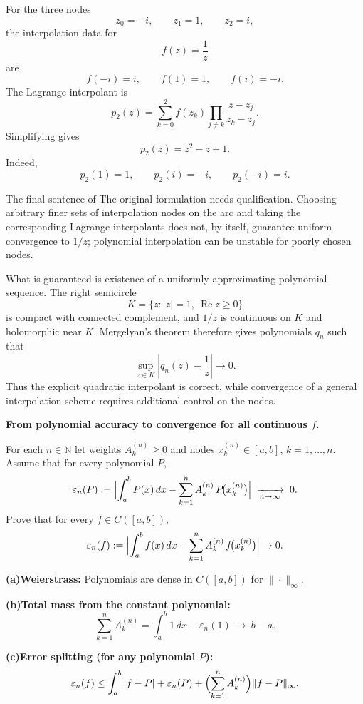 \begin{solution}
For the three nodes
\[
z_0=-i,\qquad z_1=1,\qquad z_2=i,
\]
the interpolation data for
\[
f(z)=\frac1z
\]
are
\[
f(-i)=i,\qquad f(1)=1,\qquad f(i)=-i.
\]
The Lagrange interpolant is
\[
p_2(z)
=
\sum_{k=0}^{2}
f(z_k)
\prod_{j\ne k}
\frac{z-z_j}{z_k-z_j}.
\]
Simplifying gives
\[
\boxed{
p_2(z)=z^2-z+1.
}
\]
Indeed,
\[
p_2(1)=1,\qquad
p_2(i)=-i,\qquad
p_2(-i)=i.
\]

The final sentence of The original formulation needs qualification. Choosing arbitrary finer sets
of interpolation nodes on the arc and taking the corresponding Lagrange interpolants does
not, by itself, guarantee uniform convergence to \(1/z\); polynomial interpolation can be
unstable for poorly chosen nodes.

What is guaranteed is existence of a uniformly approximating polynomial sequence. The
right semicircle
\[
K=\{z:|z|=1,\ \operatorname{Re}z\ge0\}
\]
is compact with connected complement, and \(1/z\) is continuous on \(K\) and holomorphic
near \(K\). Mergelyan's theorem therefore gives polynomials \(q_n\) such that
\[
\boxed{
\sup_{z\in K}
\left|
q_n(z)-\frac1z
\right|
\to0.
}
\]
Thus the explicit quadratic interpolant is correct, while convergence of a general
interpolation scheme requires additional control on the nodes.
\end{solution}


\begin{problem}[CP-II-0182]
\label{prob:cp-ii-0182}
\textbf{From polynomial accuracy to convergence for all continuous $f$.}

\hspace*{1.5em}For each $n\in\mathbb N$ let weights $A_k^{(n)}\ge 0$ and nodes $x_k^{(n)}\in[a,b]$, $k=1,\dots,n$.
	Assume that for every polynomial $P$,
	\[
	\varepsilon_n(P):=\Bigl|\int_a^b P(x)\,dx-\sum_{k=1}^n A_k^{(n)}\,P\!\bigl(x_k^{(n)}\bigr)\Bigr|
	\;\xrightarrow[n\to\infty]{}\;0 .
	\]
	Prove that for every $f\in C([a,b])$,
	\[
	\varepsilon_n(f):=\Bigl|\int_a^b f(x)\,dx-\sum_{k=1}^n A_k^{(n)}\,f\!\bigl(x_k^{(n)}\bigr)\Bigr|\to 0.
	\]

	\bigskip

	 \setlength{\itemsep}{0.6em}
		\par\smallskip\noindent\textbf{(a)}\quad \textbf{Weierstrass:} Polynomials are dense in $C([a,b])$ for $\|\cdot\|_\infty$.
		\par\smallskip\noindent\textbf{(b)}\quad \textbf{Total mass from the constant polynomial:}
		\[
		\sum_{k=1}^n A_k^{(n)}=\int_a^b 1\,dx - \varepsilon_n(1)\ \longrightarrow\ b-a .
		\]
		\par\smallskip\noindent\textbf{(c)}\quad \textbf{Error splitting (for any polynomial $P$):}
		\[
		\varepsilon_n(f)\le \int_a^b |f-P|
		+ \varepsilon_n(P) + \Bigl(\sum_{k=1}^n A_k^{(n)}\Bigr)\|f-P\|_\infty .
		\]

	\bigskip
\end{problem}

